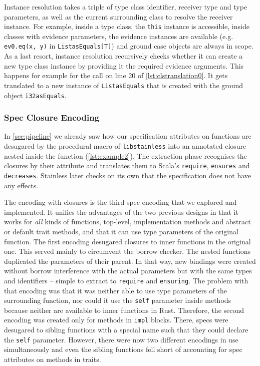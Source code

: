 Instance resolution takes a triple of type class identifier, receiver type and
type parameters, as well as the current surrounding class to resolve the
receiver instance. For example, inside a type class, the \lstinline!this!
instance is accessible, inside classes with evidence parameters, the evidence
instances are available (e.g. \lstinline!ev0.eq(x, y)! in
\lstinline!ListasEquals[T]!) and ground case objects are always in scope. As a
last resort, instance resolution recursively checks whether it can create a new
type class instance by providing it the required evidence arguments. This
happens for example for the call on line 20 of \autoref{lst:clstranslation0}. It
gets translated to a new instance of \lstinline!ListasEquals! that is created
with the ground object \lstinline!i32asEquals!.



\subsubsection{Spec Closure Encoding}

In \autoref{sec:pipeline} we already saw how our specification attributes
on functions are desugared by the procedural macro of
\passthrough{\lstinline!libstainless!} into an annotated closure nested
inside the function (\autoref{lst:example2}). The extraction phase
recognises the closures by their attribute and translates them to
Scala's \passthrough{\lstinline!require!},
\passthrough{\lstinline!ensures!} and
\passthrough{\lstinline!decreases!}. Stainless later checks on its own
that the specification does not have any effects.

The encoding with closures is the third spec encoding that we explored
and implemented. It unifies the advantages of the two previous designs
in that it works for \emph{all} kinds of functions, top-level,
implementation methods and abstract or default trait methods, and that
it can use type parameters of the original function. The first encoding
desugared closures to inner functions in the original one. This served
mainly to circumvent the borrow checker. The nested functions duplicated
the parameters of their parent. In that way, new bindings were created
without borrow interference with the actual parameters but with the same
types and identifiers -- simple to extract to
\passthrough{\lstinline!require!} and
\passthrough{\lstinline!ensuring!}. The problem with that encoding was
that it was neither able to use type parameters of the surrounding
function, nor could it use the \passthrough{\lstinline!self!} parameter
inside methods because neither are available to inner functions in Rust.
Therefore, the second encoding was created only for methods in
\passthrough{\lstinline!impl!} blocks. There, specs were desugared to
sibling functions with a special name such that they could declare the
\passthrough{\lstinline!self!} parameter. However, there were now two
different encodings in use simultaneously and even the sibling functions
fell short of accounting for spec attributes on methods in traits.

